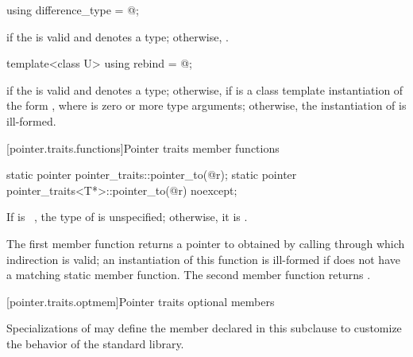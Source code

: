 %
\begin{itemdecl}
using difference_type = @\seebelow@;
\end{itemdecl}

\begin{itemdescr}
\pnum
\ctype {} if
the   is valid and denotes a
type; otherwise,
.
\end{itemdescr}

%
\begin{itemdecl}
template<class U> using rebind = @\seebelow@;
\end{itemdecl}

\begin{itemdescr}
\pnum
\templalias {} if
the   is valid and denotes a
type; otherwise,
 if
 is a class template instantiation of the form ,
where  is zero or more type arguments; otherwise, the instantiation of
 is ill-formed.
\end{itemdescr}

[pointer.traits.functions]{Pointer traits member functions}

%
\begin{itemdecl}
static pointer pointer_traits::pointer_to(@\seebelow@ r);
static pointer pointer_traits<T*>::pointer_to(@\seebelow@ r) noexcept;
\end{itemdecl}

\begin{itemdescr}
\pnum
\remarks If  is \cv{}~, the type of
 is unspecified; otherwise, it is .

\pnum
\returns The first member function returns a pointer to 
obtained by calling  through which
indirection is valid; an instantiation of this function is
ill-formed if  does not have a matching  static member
function. The second member function returns .
\end{itemdescr}

[pointer.traits.optmem]{Pointer traits optional members}

\pnum
Specializations of  may define the member declared
in this subclause to customize the behavior of the standard library.

